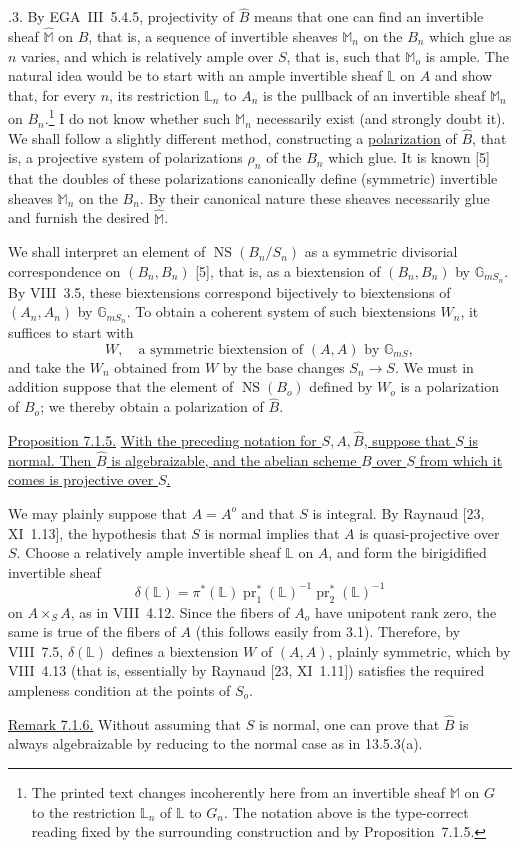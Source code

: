 \medskip
{}.3. By EGA~III~5.4.5, projectivity of $\widehat B$ means that one
can find an invertible sheaf $\widehat{\mathbb M}$ on $\widehat B$,
that is, a sequence of invertible sheaves $\mathbb M_n$ on the $B_n$
which glue as $n$ varies, and which is relatively ample over $S$, that
is, such that $\mathbb M_o$ is ample.  The natural idea would be to
start with an ample invertible sheaf $\mathbb L$ on $A$ and show that,
for every $n$, its restriction $\mathbb L_n$ to $A_n$ is the pullback
of an invertible sheaf $\mathbb M_n$ on $B_n$.\footnote{The printed
text changes incoherently here from an invertible sheaf $\mathbb M$ on
$G$ to the restriction $\mathbb L_n$ of $\mathbb L$ to $G_n$.  The
notation above is the type-correct reading fixed by the surrounding
construction and by Proposition~7.1.5.}  I do not know whether such
$\mathbb M_n$ necessarily exist (and strongly doubt it).  We shall
follow a slightly different method, constructing a
\underline{polarization} of $\widehat B$, that is, a projective system
of polarizations $\rho_n$ of the $B_n$ which glue.  It is known [5]
that the doubles of these polarizations canonically define
(symmetric) invertible sheaves $\mathbb M_n$ on the $B_n$.  By their
canonical nature these sheaves necessarily glue and furnish the
desired $\widehat{\mathbb M}$.

We shall interpret an element of $\operatorname{NS}(B_n/S_n)$ as a
symmetric divisorial correspondence on $(B_n,B_n)$ [5], that is, as a
biextension of $(B_n,B_n)$ by $\mathbb G_{mS_n}$.  By VIII~3.5, these
biextensions correspond bijectively to biextensions of $(A_n,A_n)$ by
$\mathbb G_{mS_n}$.  To obtain a coherent system of such biextensions
$W_n$, it suffices to start with
\begin{equation}\tag{7.1.4}
 W,\quad\text{a symmetric biextension of $(A,A)$ by $\mathbb G_{mS}$},
\end{equation}
and take the $W_n$ obtained from $W$ by the base changes
$S_n\longrightarrow S$.  We must in addition suppose that the element
of $\operatorname{NS}(B_o)$ defined by $W_o$ is a polarization of
$B_o$; we thereby obtain a polarization of $\widehat B$.

\medskip
\noindent
\underline{Proposition 7.1.5.} \underline{With the preceding notation
for $S,A,\widehat B$, suppose that $S$ is normal.  Then $\widehat B$ is
algebraizable, and the abelian scheme $B$ over $S$ from which it comes
is projective over $S$.}

We may plainly suppose that $A=A^o$ and that $S$ is integral.  By
Raynaud [23, XI~1.13], the hypothesis that $S$ is normal implies that
$A$ is quasi-projective over $S$.  Choose a relatively ample
invertible sheaf $\mathbb L$ on $A$, and form the birigidified
invertible sheaf
\[
 \delta(\mathbb L)=
 \pi^*(\mathbb L)\operatorname{pr}_1^*(\mathbb L)^{-1}
 \operatorname{pr}_2^*(\mathbb L)^{-1}
\]
on $A\times_S A$, as in VIII~4.12.  Since the fibers of $A_o$ have
unipotent rank zero, the same is true of the fibers of $A$ (this
follows easily from 3.1).  Therefore, by VIII~7.5,
$\delta(\mathbb L)$ defines a biextension $W$ of $(A,A)$, plainly
symmetric, which by VIII~4.13 (that is, essentially by Raynaud
[23, XI~1.11]) satisfies the required ampleness condition at the
points of $S_o$.

\medskip
\noindent
\underline{Remark 7.1.6.} Without assuming that $S$ is normal, one
can prove that $\widehat B$ is always algebraizable by reducing to the
normal case as in 13.5.3(a).
